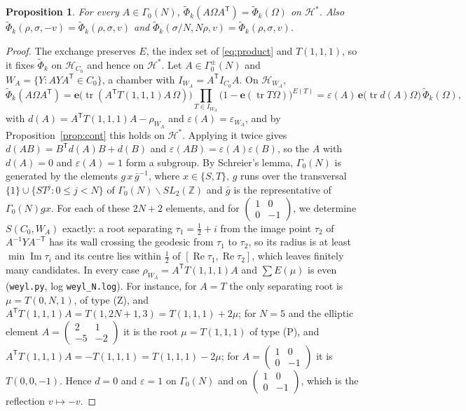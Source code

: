 \documentclass[11pt]{amsart}
\numberwithin{equation}{section}
\theoremstyle{plain}
\newtheorem{prop}[thm]{Proposition}
\theoremstyle{definition}
\theoremstyle{remark}
\newcommand{\Z}{\mathbb{Z}}
\newcommand{\e}{\mathbf{e}}
\newcommand{\tPhi}{\widetilde{\Phi}}
\newcommand{\sm}[4]{\left(\begin{smallmatrix}#1&#2\\#3&#4\end{smallmatrix}\right)}
\begin{document}
\begin{prop}\label{prop:gamma0}
For every $A\in\Gamma_0(N)$, $\tPhi_k(A\Omega A^{\mathsf T})=\tPhi_k(\Omega)$ on $\mathcal H^*$. Also $\tPhi_k(\rho,\sigma,-v)=\tPhi_k(\rho,\sigma,v)$ and $\tPhi_k(\sigma/N,N\rho,v)=\tPhi_k(\rho,\sigma,v)$.
\end{prop}

\begin{proof}
The exchange preserves $E$, the index set of \eqref{eq:product} and $T(1,1,1)$, so it fixes $\tPhi_k$ on $\mathcal H_{C_0}$ and hence on $\mathcal H^*$. Let $A\in\Gamma^\pm_0(N)$ and $W_A=\{Y:AYA^{\mathsf T}\in C_0\}$, a chamber with $I_{W_A}=A^{\mathsf T}I_{C_0}A$. On $\mathcal H_{W_A}$,
\[
\tPhi_k(A\Omega A^{\mathsf T})=\e\bigl(\operatorname{tr}(A^{\mathsf T}T(1,1,1)A\,\Omega)\bigr)\prod_{T\in I_{W_A}}\bigl(1-\e(\operatorname{tr}T\Omega)\bigr)^{E(T)}=\varepsilon(A)\,\e\bigl(\operatorname{tr}d(A)\Omega\bigr)\,\tPhi_k(\Omega),
\]
with $d(A)=A^{\mathsf T}T(1,1,1)A-\rho_{W_A}$ and $\varepsilon(A)=\varepsilon_{W_A}$, and by Proposition~\ref{prop:cont} this holds on $\mathcal H^*$. Applying it twice gives $d(AB)=B^{\mathsf T}d(A)B+d(B)$ and $\varepsilon(AB)=\varepsilon(A)\varepsilon(B)$, so the $A$ with $d(A)=0$ and $\varepsilon(A)=1$ form a subgroup. By Schreier's lemma, $\Gamma_0(N)$ is generated by the elements $g\,x\,\bar g^{-1}$, where $x\in\{S,T\}$, $g$ runs over the transversal $\{1\}\cup\{ST^j:0\le j<N\}$ of $\Gamma_0(N)\backslash SL_2(\Z)$ and $\bar g$ is the representative of $\Gamma_0(N)gx$. For each of these $2N+2$ elements, and for $\sm100{-1}$, we determine $S(C_0,W_A)$ exactly: a root separating $\tau_1=\frac12+i$ from the image point $\tau_2$ of $A^{-1}YA^{-\mathsf T}$ has its wall crossing the geodesic from $\tau_1$ to $\tau_2$, so its radius is at least $\min\operatorname{Im}\tau_i$ and its centre lies within $\frac12$ of $[\operatorname{Re}\tau_1,\operatorname{Re}\tau_2]$, which leaves finitely many candidates. In every case $\rho_{W_A}=A^{\mathsf T}T(1,1,1)A$ and $\sum E(\mu)$ is even (\texttt{weyl.py}, log \texttt{weyl\_N.log}). For instance, for $A=T$ the only separating root is $\mu=T(0,N,1)$, of type (Z), and $A^{\mathsf T}T(1,1,1)A=T(1,2N+1,3)=T(1,1,1)+2\mu$; for $N=5$ and the elliptic element $A=\sm21{-5}{-2}$ it is the root $\mu=T(1,1,1)$ of type (P), and $A^{\mathsf T}T(1,1,1)A=-T(1,1,1)=T(1,1,1)-2\mu$; for $A=\sm100{-1}$ it is $T(0,0,-1)$. Hence $d=0$ and $\varepsilon=1$ on $\Gamma_0(N)$ and on $\sm100{-1}$, which is the reflection $v\mapsto-v$.
\end{proof}
\end{document}
